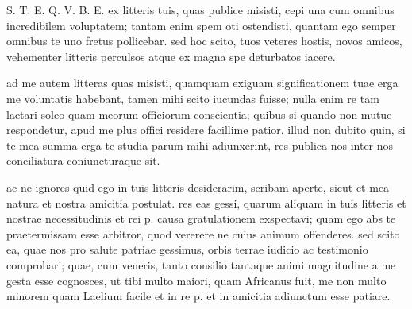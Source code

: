 


 S. T. E. Q. V. B. E. ex litteris tuis, quas publice misisti, cepi una cum omnibus incredibilem voluptatem; tantam enim spem oti ostendisti, quantam ego semper omnibus te uno fretus pollicebar. sed hoc scito, tuos veteres hostis, novos amicos, vehementer litteris perculsos atque ex magna spe deturbatos iacere.

 ad me autem litteras quas misisti, quamquam exiguam significationem tuae erga me voluntatis habebant, tamen mihi scito iucundas fuisse; nulla enim re tam laetari soleo quam meorum officiorum conscientia; quibus si quando non mutue respondetur, apud me plus offici residere facillime patior. illud non dubito quin, si te mea summa erga te studia parum mihi adiunxerint, res publica nos inter nos conciliatura coniuncturaque sit.

 ac ne ignores quid ego in tuis litteris desiderarim, scribam aperte, sicut et mea natura et nostra amicitia postulat. res eas gessi, quarum aliquam in tuis litteris et nostrae necessitudinis et rei p. causa gratulationem exspectavi; quam ego abs te praetermissam esse arbitror, quod vererere ne cuius animum offenderes. sed scito ea, quae nos pro salute patriae gessimus, orbis terrae iudicio ac testimonio comprobari; quae, cum veneris, tanto consilio tantaque animi magnitudine a me gesta esse cognosces, ut tibi multo maiori, quam Africanus fuit, me non multo minorem quam Laelium facile et in re p. et in amicitia adiunctum esse patiare.
